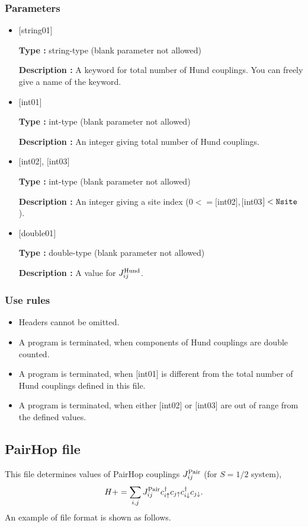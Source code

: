 \subsubsection{Parameters}
 \begin{itemize}

   \item  $[$string01$]$
   
    {\bf Type :} string-type (blank parameter not allowed)

   {\bf Description :}  A keyword for total number of Hund couplings. You can freely give a name of the keyword.

   \item  $[$int01$]$
   
    {\bf Type :} int-type (blank parameter not allowed)

   {\bf Description :} An integer giving total number of Hund couplings.

  \item  $[$int02$]$, $[$int03$]$
  
 {\bf Type :} int-type (blank parameter not allowed)

{\bf Description :} An integer giving a site index ($0<= [$int02$], [$int03$]<\verb|Nsite|$).
 
 \item  $[$double01$]$
   
   {\bf Type :} double-type (blank parameter not allowed)

  {\bf Description :}  A value for $J_{ij}^{\rm Hund}$.
  
\end{itemize}

\subsubsection{Use rules}
\begin{itemize}
\item Headers cannot be omitted. 
\item A program is terminated, when components of Hund couplings are double counted.
\item A program is terminated, when $[$int01$]$ is different from the total number of Hund couplings defined in this file.
\item A program is terminated, when either $[$int02$]$ or $[$int03$]$ are out of range from the defined values.
\end{itemize}

\newpage
\subsection{PairHop file}
This file determines values of PairHop couplings $J_{ij}^{\rm Pair}$ {(for $S=1/2$ system)},
\begin{equation}
H+=\sum_{i,j}J_{ij}^{\rm Pair} c_ {i \uparrow}^{\dag}c_{j\uparrow}c_{i \downarrow}^{\dag}c_{j  \downarrow}.
\end{equation}
An example of file format is shown as follows.

